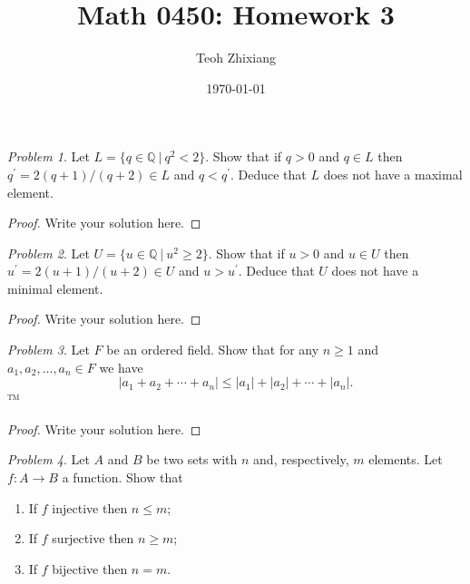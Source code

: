 \documentclass[11pt,twoside, reqno, align]{amsart}
\theoremstyle{remark}
\newtheorem{Prob}{Problem}
\def\Q{\mathbb Q}
\begin{document}
\title{Math 0450: Homework 3}
\date{\today}
\author{Teoh Zhixiang}

\maketitle



\begin{Prob}
Let $L=\{q\in \Q~|~q^2<2\}$. Show that  if $q>0$ and $q\in L$ then $q^\prime=2(q+1)/(q+2)\in L$ and $q<q^\prime$. Deduce that $L$ does not have a maximal element.
\end{Prob}

\begin{proof}
Write your solution here.

\end{proof}

\begin{Prob}
Let $U=\{u\in \Q~|~u^2\geq 2\}$. Show that  if $u>0$ and $u\in U$ then $u^\prime=2(u+1)/(u+2)\in U$ and $u>u^\prime$. Deduce that $U$ does not have a minimal element.
\end{Prob}

\begin{proof}
Write your solution here.

\end{proof}


\begin{Prob}
Let $F$ be an ordered field. Show that for any $n\geq 1$ and $a_1, a_2, \dots, a_n \in F$ we have
$$
|a_1+a_2+\cdots+a_n|\leq |a_1|+|a_2|+\cdots+|a_n|.
$$™
\end{Prob}

\begin{proof}
Write your solution here.

\end{proof}


\begin{Prob}
Let $A$ and $B$ be two sets with $n$ and, respectively, $m$ elements. Let $f:A\to B$ a function. Show that
\begin{enumerate}
\item If $f$ injective then $n\leq m$;
\item If $f$ surjective then $n\geq m$;
\item If $f$ bijective then $n=m$.
\end{enumerate}
\end{Prob}
\end{document}

